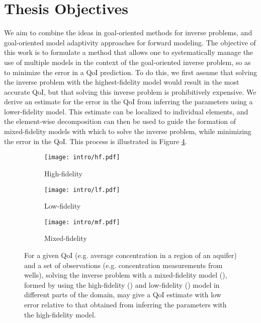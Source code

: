 

\section{Thesis Objectives}  %

We aim to combine the ideas in goal-oriented methods for inverse problems, and goal-oriented model adaptivity approaches for forward modeling. The objective of this work is to formulate a method that allows one to systematically manage the use of multiple models in the context of the goal-oriented inverse problem, so as to minimize the error in a QoI prediction. To do this, we first assume that solving the inverse problem with the highest-fidelity model would result in the most accurate QoI, but that solving this inverse problem is prohibitively expensive. We derive an estimate for the error in the QoI from inferring the parameters using a lower-fidelity model. This estimate can be localized to individual elements, and the element-wise decomposition can then be used to guide the formation of mixed-fidelity models with which to solve the inverse problem, while minimizing the error in the QoI. This process is illustrated in Figure \ref{fig:lfhfmf}.

\begin{figure}[h]
\centering
\begin{subfigure}[b]{0.32\textwidth}
\texttt{[image: intro/hf.pdf]}
\caption{High-fidelity}
\label{subfig:hf}
\end{subfigure}
\begin{subfigure}[b]{0.32\textwidth}
\texttt{[image: intro/lf.pdf]}
\caption{Low-fidelity}
\label{subfig:lf}
\end{subfigure}
\begin{subfigure}[b]{0.32\textwidth}
\texttt{[image: intro/mf.pdf]}
\caption{Mixed-fidelity}
\label{subfig:mf}
\end{subfigure}
\caption{For a given QoI (e.g. average concentration in a region of an aquifer) and a set of observations (e.g. concentration measurements from wells), solving the inverse problem with a mixed-fidelity model (), formed by using the high-fidelity () and low-fidelity () model in different parts of the domain, may give a QoI estimate with low error relative to that obtained from inferring the parameters with the high-fidelity model.}
\label{fig:lfhfmf}
\end{figure}

